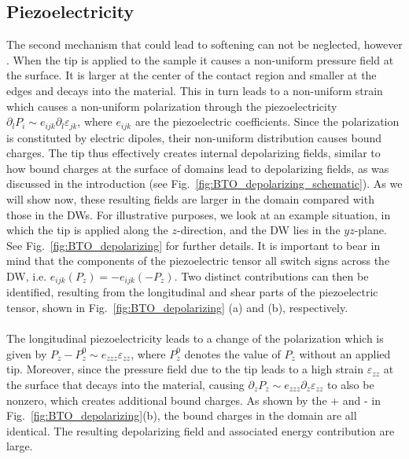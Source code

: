 \subsection{Piezoelectricity \label{sec:BTO_piezoelectricity}}
The second mechanism that could lead to softening can not be neglected, however \cite{Tsuji2005,Stefani2020}.
When the tip is applied to the sample it causes a non-uniform pressure field at the surface.
It is larger at the center of the contact region and smaller at the edges and decays into the material.
This in turn leads to a non-uniform strain which causes a non-uniform polarization through the piezoelectricity $\partial_l P_i \sim e_{ijk} \partial_l \varepsilon_{jk}$, where $e_{ijk}$ are the piezoelectric coefficients.
Since the polarization is constituted by electric dipoles, their non-uniform distribution causes bound charges.
The tip thus effectively creates internal depolarizing fields, similar to how bound charges at the surface of domains lead to depolarizing fields, as was discussed in the introduction (see Fig.~\ref{fig:BTO_depolarizing_schematic}). 
As we will show now, these resulting fields are larger in the domain compared with those in the DWs.
For illustrative purposes, we look at an example situation, in which the tip is applied along the $z$-direction, and the DW lies in the $yz$-plane. See Fig.~\ref{fig:BTO_depolarizing} for further details.
It is important to bear in mind that the components of the piezoelectric tensor all switch signs across the DW, i.e. $e_{ijk}(P_z) = - e_{ijk}(-P_z)$. 
Two distinct contributions can then be identified, resulting from the longitudinal and shear parts of the piezoelectric tensor, shown in Fig.~\ref{fig:BTO_depolarizing} (a) and (b), respectively.
\\\\
The longitudinal piezoelectricity leads to a change of the polarization which is given by $P_z - P^0_z \sim e_{zzz} \varepsilon_{zz}$, where $P^0_z$ denotes the value of $P_z$ without an applied tip.
Moreover, since the pressure field due to the tip leads to a high strain $\varepsilon_{zz}$ at the surface that decays into the material, causing $\partial_{z} P_z \sim e_{zzz} \partial_z \varepsilon_{zz}$ to also be nonzero, which creates additional bound charges.
As shown by the + and - in Fig.~\ref{fig:BTO_depolarizing}(b), the bound charges in the domain are all identical.
The resulting depolarizing field and associated energy contribution are large.

